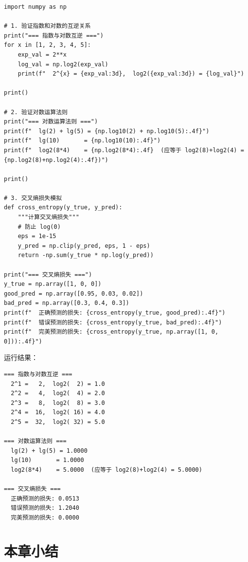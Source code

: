 \begin{lstlisting}[caption=对数函数的数值验证]
import numpy as np

# 1. 验证指数和对数的互逆关系
print("=== 指数与对数互逆 ===")
for x in [1, 2, 3, 4, 5]:
    exp_val = 2**x
    log_val = np.log2(exp_val)
    print(f"  2^{x} = {exp_val:3d},  log2({exp_val:3d}) = {log_val}")

print()

# 2. 验证对数运算法则
print("=== 对数运算法则 ===")
print(f"  lg(2) + lg(5) = {np.log10(2) + np.log10(5):.4f}")
print(f"  lg(10)       = {np.log10(10):.4f}")
print(f"  log2(8*4)    = {np.log2(8*4):.4f}  (应等于 log2(8)+log2(4) = {np.log2(8)+np.log2(4):.4f})")

print()

# 3. 交叉熵损失模拟
def cross_entropy(y_true, y_pred):
    """计算交叉熵损失"""
    # 防止 log(0)
    eps = 1e-15
    y_pred = np.clip(y_pred, eps, 1 - eps)
    return -np.sum(y_true * np.log(y_pred))

print("=== 交叉熵损失 ===")
y_true = np.array([1, 0, 0])
good_pred = np.array([0.95, 0.03, 0.02])
bad_pred = np.array([0.3, 0.4, 0.3])
print(f"  正确预测的损失: {cross_entropy(y_true, good_pred):.4f}")
print(f"  错误预测的损失: {cross_entropy(y_true, bad_pred):.4f}")
print(f"  完美预测的损失: {cross_entropy(y_true, np.array([1, 0, 0])):.4f}")
\end{lstlisting}

运行结果：
\begin{lstlisting}[frame=none,backgroundcolor={},numbers=none]
=== 指数与对数互逆 ===
  2^1 =   2,  log2(  2) = 1.0
  2^2 =   4,  log2(  4) = 2.0
  2^3 =   8,  log2(  8) = 3.0
  2^4 =  16,  log2( 16) = 4.0
  2^5 =  32,  log2( 32) = 5.0

=== 对数运算法则 ===
  lg(2) + lg(5) = 1.0000
  lg(10)       = 1.0000
  log2(8*4)    = 5.0000  (应等于 log2(8)+log2(4) = 5.0000)

=== 交叉熵损失 ===
  正确预测的损失: 0.0513
  错误预测的损失: 1.2040
  完美预测的损失: 0.0000
\end{lstlisting}


\section{本章小结}

